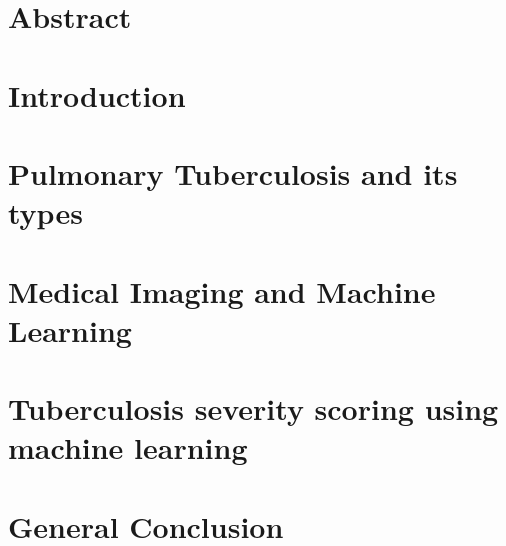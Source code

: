 \documentclass[12pt]{report}
\begin{document}
 
\chapter*{Abstract}


\tableofcontents
\chapter*{Introduction}

\chapter{Pulmonary Tuberculosis and its types}

\chapter{Medical Imaging and Machine Learning}

\chapter{Tuberculosis severity scoring using machine learning}

\chapter*{General Conclusion}


\newpage
\printacronyms[include-classes=abbrev,name=Abbreviations]
\listoffigures
\listoftables
\newpage
 

\end{document}
